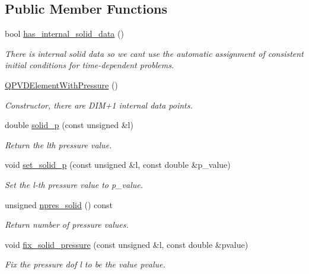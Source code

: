 \subsection*{Public Member Functions}
\begin{DoxyCompactItemize}
\item 
bool \hyperlink{classoomph_1_1QPVDElementWithPressure_ad94b8af9930b59635389d803b94046ad}{has\+\_\+internal\+\_\+solid\+\_\+data} ()
\begin{DoxyCompactList}\small\item\em There is internal solid data so we can\textquotesingle{}t use the automatic assignment of consistent initial conditions for time-\/dependent problems. \end{DoxyCompactList}\item 
\hyperlink{classoomph_1_1QPVDElementWithPressure_aee5331c9d519ad9d86a7fce7e6a3cc17}{Q\+P\+V\+D\+Element\+With\+Pressure} ()
\begin{DoxyCompactList}\small\item\em Constructor, there are D\+I\+M+1 internal data points. \end{DoxyCompactList}\item 
double \hyperlink{classoomph_1_1QPVDElementWithPressure_ae60d58f767b89eb8ecf147da5e646bf3}{solid\+\_\+p} (const unsigned \&l)
\begin{DoxyCompactList}\small\item\em Return the lth pressure value. \end{DoxyCompactList}\item 
void \hyperlink{classoomph_1_1QPVDElementWithPressure_a50241b9156808fb68182405335438769}{set\+\_\+solid\+\_\+p} (const unsigned \&l, const double \&p\+\_\+value)
\begin{DoxyCompactList}\small\item\em Set the l-\/th pressure value to p\+\_\+value. \end{DoxyCompactList}\item 
unsigned \hyperlink{classoomph_1_1QPVDElementWithPressure_a3be2b5458ab056e38eadb28d27995397}{npres\+\_\+solid} () const
\begin{DoxyCompactList}\small\item\em Return number of pressure values. \end{DoxyCompactList}\item 
void \hyperlink{classoomph_1_1QPVDElementWithPressure_aaac5b7095fbd8fd4a8195554e6422ceb}{fix\+\_\+solid\+\_\+pressure} (const unsigned \&l, const double \&pvalue)
\begin{DoxyCompactList}\small\item\em Fix the pressure dof l to be the value pvalue. \end{DoxyCompactList}\item 

\end{DoxyCompactItemize}
